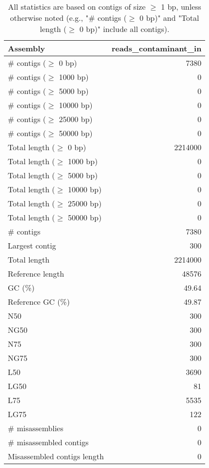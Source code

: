 \documentclass[12pt,a4paper]{article}
\begin{document}
\begin{table}[ht]
\begin{center}
\caption{All statistics are based on contigs of size $\geq$ 1 bp, unless otherwise noted (e.g., "\# contigs ($\geq$ 0 bp)" and "Total length ($\geq$ 0 bp)" include all contigs).}
\begin{tabular}{|l*{1}{|r}|}
\hline
Assembly & reads\_contaminant\_in \\ \hline
\# contigs ($\geq$ 0 bp) & 7380 \\ \hline
\# contigs ($\geq$ 1000 bp) & 0 \\ \hline
\# contigs ($\geq$ 5000 bp) & 0 \\ \hline
\# contigs ($\geq$ 10000 bp) & 0 \\ \hline
\# contigs ($\geq$ 25000 bp) & 0 \\ \hline
\# contigs ($\geq$ 50000 bp) & 0 \\ \hline
Total length ($\geq$ 0 bp) & 2214000 \\ \hline
Total length ($\geq$ 1000 bp) & 0 \\ \hline
Total length ($\geq$ 5000 bp) & 0 \\ \hline
Total length ($\geq$ 10000 bp) & 0 \\ \hline
Total length ($\geq$ 25000 bp) & 0 \\ \hline
Total length ($\geq$ 50000 bp) & 0 \\ \hline
\# contigs & 7380 \\ \hline
Largest contig & 300 \\ \hline
Total length & 2214000 \\ \hline
Reference length & 48576 \\ \hline
GC (\%) & 49.64 \\ \hline
Reference GC (\%) & 49.87 \\ \hline
N50 & 300 \\ \hline
NG50 & 300 \\ \hline
N75 & 300 \\ \hline
NG75 & 300 \\ \hline
L50 & 3690 \\ \hline
LG50 & 81 \\ \hline
L75 & 5535 \\ \hline
LG75 & 122 \\ \hline
\# misassemblies & 0 \\ \hline
\# misassembled contigs & 0 \\ \hline
Misassembled contigs length & 0 \\ \hline

\end{tabular}
\end{center}
\end{table}
\end{document}
